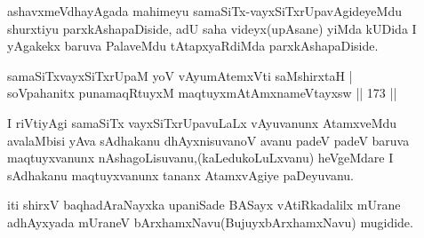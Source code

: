 \begin{artha}
ashavxmeVdhayAgada mahimeyu samaSiTx-vayxSiTxrUpavAgideyeMdu shurxtiyu parxkAshapaDiside, adU saha videyx(upAsane) yiMda kUDida I yAgakekx baruva PalaveMdu tAtapxyaRdiMda parxkAshapaDiside.
\end{artha}


\begin{shl}
samaSiTxvayxSiTxrUpaM yoV vAyumAtemxVti saMshirxtaH |\\
soV\s pahanitx punamaqRtuyxM maqtuyxmAtAmxnameVtayxsw \hfill || 173 ||
\end{shl}

\begin{artha}
I riVtiyAgi samaSiTx vayxSiTxrUpavuLaLx vAyuvanunx AtamxveMdu avalaMbisi yAva sAdhakanu dhAyxnisuvanoV avanu padeV padeV baruva maqtuyxvanunx nAshagoLisuvanu,(kaLedukoLuLxvanu) heVgeMdare I sAdhakanu maqtuyxvanunx tananx AtamxvAgiye paDeyuvanu.
\end{artha}

\begin{center}
iti shirxV baqhadAraNayxka upaniSade BASayx vAtiRkadalilx mUrane adhAyxyada mUraneV bArxhamxNavu(BujuyxbArxhamxNavu) mugidide.
\end{center}
